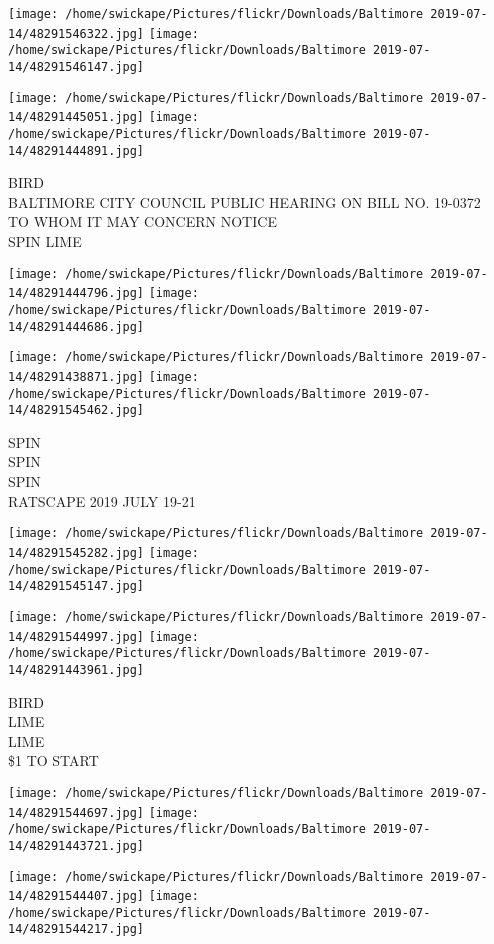 \documentclass[10pt,letterpaper]{article}
\begin{document}
\texttt{[image: /home/swickape/Pictures/flickr/Downloads/Baltimore 2019-07-14/48291546322.jpg]}
\texttt{[image: /home/swickape/Pictures/flickr/Downloads/Baltimore 2019-07-14/48291546147.jpg]}

\texttt{[image: /home/swickape/Pictures/flickr/Downloads/Baltimore 2019-07-14/48291445051.jpg]}
\texttt{[image: /home/swickape/Pictures/flickr/Downloads/Baltimore 2019-07-14/48291444891.jpg]}

BIRD\\
BALTIMORE CITY COUNCIL PUBLIC HEARING ON BILL NO. 19{-}0372\\
TO WHOM IT MAY CONCERN NOTICE\\
SPIN LIME
\pagebreak

\texttt{[image: /home/swickape/Pictures/flickr/Downloads/Baltimore 2019-07-14/48291444796.jpg]}
\texttt{[image: /home/swickape/Pictures/flickr/Downloads/Baltimore 2019-07-14/48291444686.jpg]}

\texttt{[image: /home/swickape/Pictures/flickr/Downloads/Baltimore 2019-07-14/48291438871.jpg]}
\texttt{[image: /home/swickape/Pictures/flickr/Downloads/Baltimore 2019-07-14/48291545462.jpg]}

SPIN\\
SPIN\\
SPIN\\
RATSCAPE 2019 JULY 19{-}21
\pagebreak

\texttt{[image: /home/swickape/Pictures/flickr/Downloads/Baltimore 2019-07-14/48291545282.jpg]}
\texttt{[image: /home/swickape/Pictures/flickr/Downloads/Baltimore 2019-07-14/48291545147.jpg]}

\texttt{[image: /home/swickape/Pictures/flickr/Downloads/Baltimore 2019-07-14/48291544997.jpg]}
\texttt{[image: /home/swickape/Pictures/flickr/Downloads/Baltimore 2019-07-14/48291443961.jpg]}

BIRD\\
LIME\\
LIME\\
\$1 TO START
\pagebreak

\texttt{[image: /home/swickape/Pictures/flickr/Downloads/Baltimore 2019-07-14/48291544697.jpg]}
\texttt{[image: /home/swickape/Pictures/flickr/Downloads/Baltimore 2019-07-14/48291443721.jpg]}

\texttt{[image: /home/swickape/Pictures/flickr/Downloads/Baltimore 2019-07-14/48291544407.jpg]}
\texttt{[image: /home/swickape/Pictures/flickr/Downloads/Baltimore 2019-07-14/48291544217.jpg]}
\end{document}
